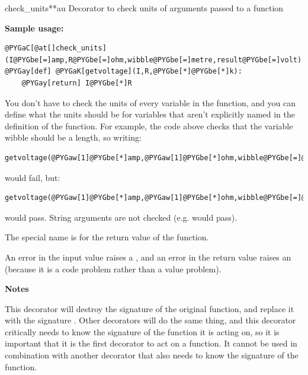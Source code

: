 \documentclass[letterpaper,10pt]{manual}
\begin{document}
\hypertarget{brian.check_units}{}\begin{funcdesc}{check\_units}{**au}
Decorator to check units of arguments passed to a function

\textbf{Sample usage:}

\begin{Verbatim}[commandchars=@\[\]]
@PYGaC[@at[]check_units](I@PYGbe[=]amp,R@PYGbe[=]ohm,wibble@PYGbe[=]metre,result@PYGbe[=]volt)
@PYGay[def] @PYGaK[getvoltage](I,R,@PYGbe[*]@PYGbe[*]k):
    @PYGay[return] I@PYGbe[*]R
\end{Verbatim}

You don't have to check the units of every variable in the function, and
you can define what the units should be for variables that aren't
explicitly named in the definition of the function. For example, the code
above checks that the variable wibble should be a length, so writing:

\begin{Verbatim}[commandchars=@\[\]]
getvoltage(@PYGaw[1]@PYGbe[*]amp,@PYGaw[1]@PYGbe[*]ohm,wibble@PYGbe[=]@PYGaw[1])
\end{Verbatim}

would fail, but:

\begin{Verbatim}[commandchars=@\[\]]
getvoltage(@PYGaw[1]@PYGbe[*]amp,@PYGaw[1]@PYGbe[*]ohm,wibble@PYGbe[=]@PYGaw[1]@PYGbe[*]metre)
\end{Verbatim}

would pass.
String arguments are not checked (e.g.  would pass).

The special name  is for the return value of the function.

An error in the input value raises a \hyperlink{brian.DimensionMismatchError}{}, and an error
in the return value raises an  (because it is a code
problem rather than a value problem).

\textbf{Notes}

This decorator will destroy the signature of the original function, and
replace it with the signature . Other decorators will
do the same thing, and this decorator critically needs to know the signature
of the function it is acting on, so it is important that it is the first
decorator to act on a function. It cannot be used in combination with another
decorator that also needs to know the signature of the function.
\end{funcdesc}
\end{document}
